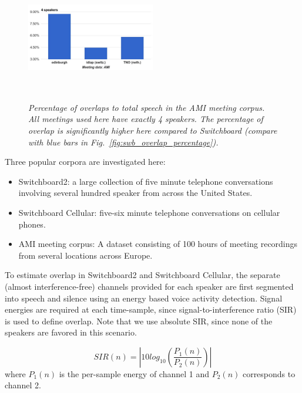 \documentclass[journal]{IEEEtran}
\begin{document}
\begin{figure}[b!]
	\vspace{0mm}
	\includegraphics[height = 2.2in, width=0.5\textwidth]{figures/ami_overlap_percentage-crop}
	\vspace{-3mm}
	\caption{\it \small Percentage of overlaps to total speech in the AMI meeting corpus. All meetings used here have exactly 4 speakers. 
		The percentage of overlap is significantly higher here compared to Switchboard (compare with blue bars in Fig.~\ref{fig:swb_overlap_percentage}).}
	\label{fig:ami_overlap_percentage}
	\vspace{-3mm}
\end{figure}


Three popular corpora are investigated here: 
\begin{itemize}
\item Switchboard2: a large collection of five minute telephone conversations involving several hundred speaker from across the United States.
\item Switchboard Cellular: five-six minute telephone conversations on cellular phones.
\item AMI meeting corpus: A dataset consisting of 100 hours of meeting recordings from several locations across Europe. 
\end{itemize}

To estimate overlap in Switchboard2 and Switchboard Cellular, the separate (almost interference-free) channels provided for each speaker are first segmented into speech and silence using an energy based voice activity detection. 
Signal energies are required at each time-sample, since signal-to-interference ratio (SIR) is used to define overlap. 
Note that we use absolute SIR, since none of the speakers are favored in this scenario. 

\begin{equation}
\label{eq:abs_sir}
SIR(n) = |10log_{10}(\frac{P_1(n)}{P_2(n)})|
\end{equation}
where $P_1(n)$ is the per-sample energy of channel 1 and $P_2(n)$ corresponds to channel 2. 
\end{document}

